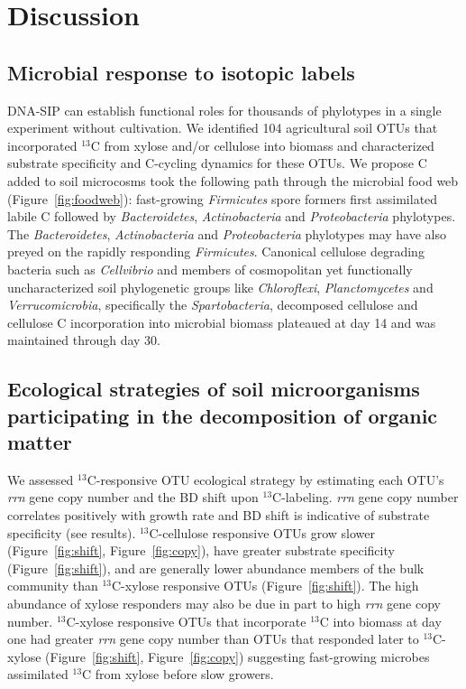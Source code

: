 \section{Discussion} 
\subsection{Microbial response to isotopic labels}
DNA-SIP can establish functional roles for thousands of phylotypes in a single
experiment without cultivation. We identified 104 agricultural soil OTUs that
incorporated $^{13}$C from xylose and/or cellulose into biomass and
characterized substrate specificity and C-cycling dynamics for these OTUs. We
propose C added to soil microcosms took the following path through the
microbial food web (Figure~\ref{fig:foodweb}): fast-growing \textit{Firmicutes}
spore formers first assimilated labile C followed by \textit{Bacteroidetes},
\textit{Actinobacteria} and \textit{Proteobacteria} phylotypes. The
\textit{Bacteroidetes}, \textit{Actinobacteria} and \textit{Proteobacteria}
phylotypes may have also preyed on the rapidly responding \textit{Firmicutes}.
Canonical cellulose degrading bacteria such as \textit{Cellvibrio} and members
of cosmopolitan yet functionally uncharacterized soil phylogenetic groups like
\textit{Chloroflexi}, \textit{Planctomycetes} and \textit{Verrucomicrobia},
specifically the \textit{Spartobacteria}, decomposed cellulose and cellulose
C incorporation into microbial biomass plateaued at day
14 and was maintained through day 30.

\subsection{Ecological strategies of soil microorganisms participating in the
decomposition of organic matter}
We assessed $^{13}$C-responsive OTU ecological strategy by estimating each
OTU's \textit{rrn} gene copy number and the BD shift upon $^{13}$C-labeling.
\textit{rrn} gene copy number correlates positively with growth rate
\citep{11125085} and BD shift is indicative of substrate specificity (see
results). $^{13}$C-cellulose responsive OTUs grow
slower (Figure~\ref{fig:shift}, Figure~\ref{fig:copy}), have greater substrate
specificity (Figure~\ref{fig:shift}), and are generally lower abundance members
of the bulk community than $^{13}$C-xylose responsive OTUs
(Figure~\ref{fig:shift}). The high abundance of xylose responders may also be
due in part to high \textit{rrn} gene copy number. $^{13}$C-xylose responsive
OTUs that incorporate $^{13}$C into biomass at day one had greater \textit{rrn}
gene copy number than OTUs that responded later to $^{13}$C-xylose
(Figure~\ref{fig:shift}, Figure~\ref{fig:copy}) suggesting fast-growing
microbes assimilated $^{13}$C from xylose before slow growers.

